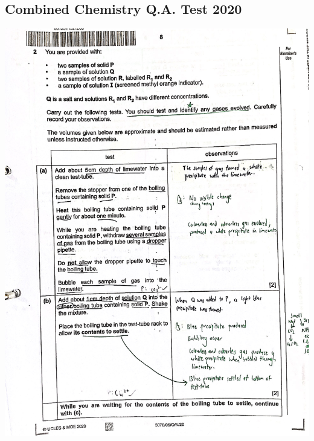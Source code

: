 \documentclass[oneside]{book}
\begin{document}
    \subsection{ Combined Chemistry Q.A. Test 2020}
    \begin{center}
        \includegraphics[width=\textwidth,height=\textheight,keepaspectratio]{images/2BDCCC19-0848-4D8E-A62C-ED809525C535.jpeg}\\

\end{center}
\end{document}
